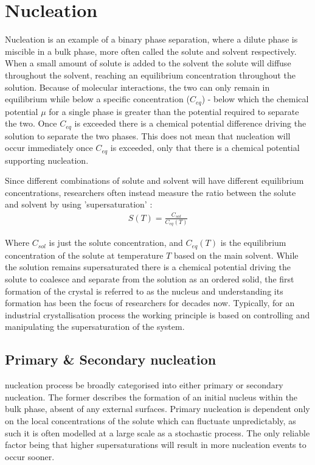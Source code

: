\section{Nucleation}
Nucleation is an example of a binary phase separation, 
where a dilute phase is miscible in a bulk phase, more 
often called the solute and solvent respectively. When 
a small amount of solute is added to the solvent the 
solute will diffuse throughout the solvent, reaching
an equilibrium concentration throughout the solution. 
Because of molecular interactions, the two can only remain 
in equilibrium while below a specific concentration ($C_{eq}$) 
- below which the chemical potential $\mu$ for a single phase 
is greater than the potential required to separate the two. 
Once $C_{eq}$ is exceeded there is a chemical potential 
difference driving the solution to separate the two phases.
This does not mean that nucleation will occur immediately 
once $C_{eq}$ is exceeded, only that there is a chemical
potential supporting nucleation.
 
Since different combinations of solute and solvent will 
have different equilibrium concentrations, researchers often 
instead measure the ratio between the solute and solvent by 
using 'supersaturation' \cite{Mullin2001}:
\begin{align}
	\label{eq:supersaturation}
	S(T) = \frac{C_{sol}}{C_{eq}(T)}
\end{align}

Where $C_{sol}$ is just the solute concentration, and 
$C_{eq}(T)$ is the equilibrium concentration of the solute  
at temperature $T$ based on the main solvent. While the 
solution remains supersaturated there is a chemical 
potential driving the solute to coalesce and separate 
from the solution as an ordered solid, the first 
formation of the crystal is referred to as the 
nucleus and understanding its formation has been the 
focus of researchers for decades now. Typically, for an 
industrial crystallisation process the working principle 
is based on controlling and manipulating the supersaturation 
of the system. 

\subsection{Primary \& Secondary nucleation}
nucleation process be broadly categorised into either primary 
or secondary nucleation. The former describes the formation 
of an initial nucleus within the bulk phase, absent of any 
external surfaces. Primary nucleation is dependent only on 
the local concentrations of the solute which can fluctuate 
unpredictably, as such it is often modelled at a large scale 
as a stochastic process. The only reliable factor being 
that higher supersaturations will result in more nucleation 
events to occur sooner.

